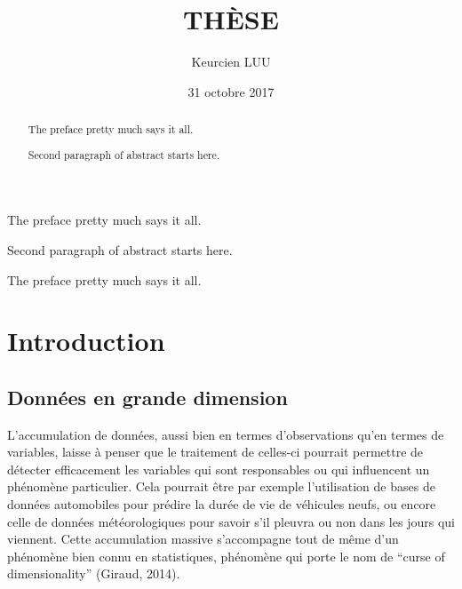 \documentclass[12pt,twoside]{reedthesis}
\title{THÈSE}
\author{Keurcien LUU}
\date{31 octobre 2017}
\begin{document}
      \maketitle
  
  \frontmatter %
  \pagestyle{empty} %

      \begin{acknowledgements}
      The preface pretty much says it all. \par  Second paragraph of abstract
      starts here.
    \end{acknowledgements}
  
      \begin{preface}
      The preface pretty much says it all. \par
    \end{preface}
  
      \hypersetup{linkcolor=black}
    \setcounter{tocdepth}{2}
    \tableofcontents
  
      \listoftables
  
      \listoffigures
  
      \begin{abstract}
      The preface pretty much says it all. \par  Second paragraph of abstract
      starts here.
    \end{abstract}
  
  
  \mainmatter %
  \pagestyle{fancyplain} %

  \chapter*{Introduction}\label{introduction}
  
  \section*{Données en grande
  dimension}\label{donnees-en-grande-dimension}
  
  L'accumulation de données, aussi bien en termes d'observations qu'en
  termes de variables, laisse à penser que le traitement de celles-ci
  pourrait permettre de détecter efficacement les variables qui sont
  responsables ou qui influencent un phénomène particulier. Cela pourrait
  être par exemple l'utilisation de bases de données automobiles pour
  prédire la durée de vie de véhicules neufs, ou encore celle de données
  météorologiques pour savoir s'il pleuvra ou non dans les jours qui
  viennent. Cette accumulation massive s'accompagne tout de même d'un
  phénomène bien connu en statistiques, phénomène qui porte le nom de
  ``curse of dimensionality'' (Giraud, 2014).
  
\end{document}

